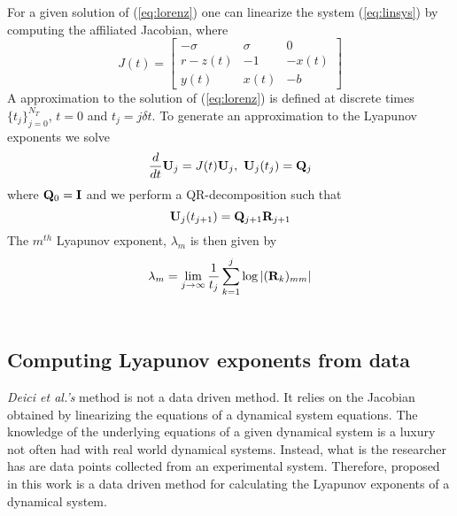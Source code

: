                 For a given solution of (\ref{eq:lorenz}) one can linearize the system (\ref{eq:linsys}) by computing the affiliated
                Jacobian, where
                \begin{equation}\label{eq:jaclor}
                    J(t) = \begin{bmatrix}
                            -\sigma & \sigma & 0 \\ r-z(t) & -1 & -x(t) \\ y(t) & x(t) & -b
                            \end{bmatrix}
                \end{equation}
                A approximation to the solution of (\ref{eq:lorenz}) is defined at discrete times $\{t_j \} _{j=0}^{N_T}$,
                $t=0$ and $t_j=j\delta t$. To generate an approximation to the Lyapunov exponents we solve
                \begin{equation}
                    \frac{d}{dt}{\bf U}_{j} = J(t){\bf U}_{j}, ~ {\bf U}_{j}(t_{j}) = {\bf Q}_{j}
                \end{equation}
                where ${\bf Q}_{0}={\bf I}$ and we perform a QR-decomposition such that
                \begin{equation}\label{eq:qr}
                    {\bf U}_{j}(t_{j+1}) = {\bf Q}_{j+1}{\bf R}_{j+1}
                \end{equation}
                The $m^{th}$ Lyapunov exponent, $\lambda_m$ is then given by
                \begin{equation}\label{eq:lyuest}
                    \lambda_{m} = \lim_{j\rightarrow \infty}\frac{1}{t_{j}}\sum_{k=1}^{j}\log  \left|({\bf R}_{k})_{mm} \right|
                \end{equation}\\
        \subsection{Computing Lyapunov exponents from data}

                \textit{Deici et al.'s} \cite{item:7} method is not a data driven method. It relies on the Jacobian obtained by linearizing
                the equations of a dynamical system equations. The knowledge of the underlying equations of a given dynamical
                system is a luxury not often had with real world dynamical systems. Instead, what is the researcher has are data
                points collected from an experimental system. Therefore, proposed in this work is a data driven method
                for calculating the Lyapunov exponents of a dynamical system.\\

